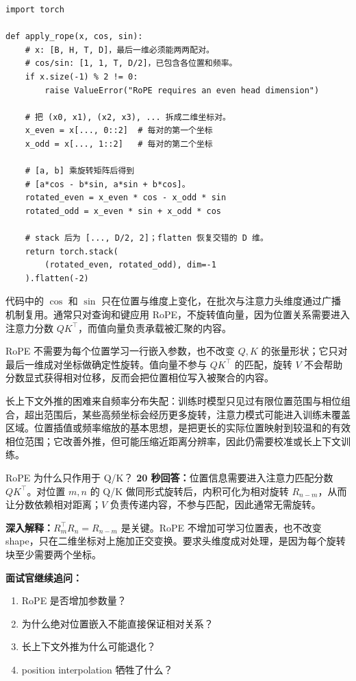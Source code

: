 \begin{lstlisting}
import torch

def apply_rope(x, cos, sin):
    # x: [B, H, T, D]，最后一维必须能两两配对。
    # cos/sin: [1, 1, T, D/2]，已包含各位置和频率。
    if x.size(-1) % 2 != 0:
        raise ValueError("RoPE requires an even head dimension")

    # 把 (x0, x1), (x2, x3), ... 拆成二维坐标对。
    x_even = x[..., 0::2]  # 每对的第一个坐标
    x_odd = x[..., 1::2]   # 每对的第二个坐标

    # [a, b] 乘旋转矩阵后得到
    # [a*cos - b*sin, a*sin + b*cos]。
    rotated_even = x_even * cos - x_odd * sin
    rotated_odd = x_even * sin + x_odd * cos

    # stack 后为 [..., D/2, 2]；flatten 恢复交错的 D 维。
    return torch.stack(
        (rotated_even, rotated_odd), dim=-1
    ).flatten(-2)
\end{lstlisting}

代码中的 $\cos$ 和 $\sin$ 只在位置与维度上变化，在批次与注意力头维度通过广播机制复用。通常只对查询和键应用 RoPE，不旋转值向量，因为位置关系需要进入注意力分数 $QK^\top$，而值向量负责承载被汇聚的内容。

RoPE 不需要为每个位置学习一行嵌入参数，也不改变 $Q,K$ 的张量形状；它只对最后一维成对坐标做确定性旋转。值向量不参与 $QK^\top$ 的匹配，旋转 $V$ 不会帮助分数显式获得相对位移，反而会把位置相位写入被聚合的内容。

长上下文外推的困难来自频率分布失配：训练时模型只见过有限位置范围与相位组合，超出范围后，某些高频坐标会经历更多旋转，注意力模式可能进入训练未覆盖区域。位置插值或频率缩放的基本思想，是把更长的实际位置映射到较温和的有效相位范围；它改善外推，但可能压缩近距离分辨率，因此仍需要校准或长上下文训练。

\begin{interviewbox}{RoPE 为什么只作用于 Q/K？}
\textbf{20 秒回答：}位置信息需要进入注意力匹配分数 $QK^\top$。对位置 $m,n$ 的 Q/K 做同形式旋转后，内积可化为相对旋转 $R_{n-m}$，从而让分数依赖相对距离；$V$ 负责传递内容，不参与匹配，因此通常无需旋转。

\textbf{深入解释：}$R_m^\top R_n=R_{n-m}$ 是关键。RoPE 不增加可学习位置表，也不改变 shape，只在二维坐标对上施加正交变换。要求头维度成对处理，是因为每个旋转块至少需要两个坐标。

\textbf{面试官继续追问：}
\begin{enumerate}
  \item RoPE 是否增加参数量？
  \item 为什么绝对位置嵌入不能直接保证相对关系？
  \item 长上下文外推为什么可能退化？
  \item position interpolation 牺牲了什么？
\end{enumerate}
\end{interviewbox}

